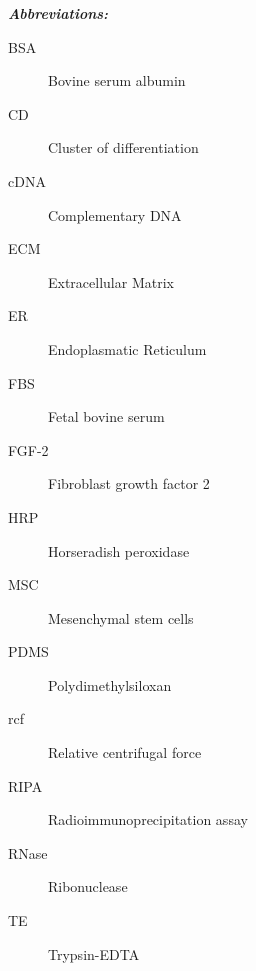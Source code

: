 \textit{\textbf{Abbreviations:}}
\begin{description}
\item[BSA] Bovine serum albumin
\item[CD] Cluster of differentiation
\item[cDNA] Complementary DNA
\item[ECM] Extracellular Matrix
\item[ER] Endoplasmatic Reticulum
\item[FBS] Fetal bovine serum
\item[FGF-2] Fibroblast growth factor 2
\item[HRP] Horseradish peroxidase
\item[MSC] Mesenchymal stem cells 
\item[PDMS] Polydimethylsiloxan
\item[rcf] Relative centrifugal force
\item[RIPA] Radioimmunoprecipitation assay
\item[RNase] Ribonuclease
\item[TE] Trypsin-EDTA
\end{description}